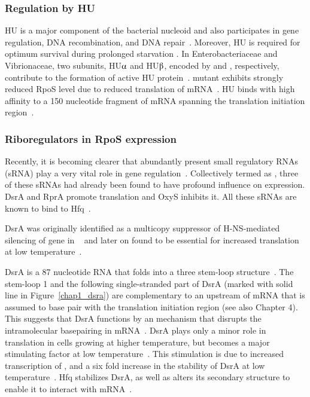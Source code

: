 \subsubsection{Regulation by HU}

HU is a major component of the bacterial nucleoid and also
participates in gene regulation, DNA recombination, and DNA
repair~\citep{Hengge2002}. Moreover, HU is required for optimum
survival during prolonged starvation \citep{Claret1997}. In
Enterobacteriaceae and Vibrionaceae, two subunits, HU$\alphaup$
and HU$\betaup$, encoded by  and , respectively,
contribute to the formation of active HU
protein~\citep{Oberto2001}\@.  mutant exhibits strongly
reduced RpoS level due to reduced translation of 
mRNA~\citep{Balandina2001}. HU binds with high affinity to a 150
nucleotide fragment of  mRNA spanning the translation
initiation region~\citep{Balandina2001}.

\subsubsection{Riboregulators in RpoS expression}
\label{chap1:srna} Recently, it is becoming clearer that
abundantly present small regulatory RNAs (sRNA) play a very vital
role in gene regulation~\citep[reviewed
in][]{Altuvia2000,Wassarman2002,Eddy2001}. Collectively termed as
, three of these sRNAs had already been found to
have profound influence on  expression. DsrA and RprA
promote  translation and OxyS inhibits it. All these sRNAs
are known to bind to Hfq~\citep{Wassarman2002}.

DsrA was originally identified as a multicopy suppressor of
H-NS-mediated silencing of  gene in
~\citep{Sledjeski1995} and later on found to be essential
for increased  translation at low
temperature~\citep{Sledjeski1996}.

DsrA is a 87 nucleotide RNA that folds into a three stem-loop
structure~\citep[][Figure~\ref{chap1_dsra}]{Lease2000,Majdalani1998}.
The stem-loop 1 and the following single-stranded part of DsrA
(marked with solid line in Figure~\ref{chap1_dsra}) are
complementary to an upstream  of 
mRNA that is assumed to base pair with the translation initiation
region (see also Chapter 4). This suggests that DsrA functions by
an  mechanism that disrupts the intramolecular
basepairing  in 
mRNA~\citep{Lease2000,Lease1998,Majdalani1998,Lease2000b}. DsrA
plays only a minor role in  translation in cells growing
at higher temperature, but becomes a major stimulating factor at
low temperature~\citep{Sledjeski1996}. This stimulation is due to
increased transcription of , and a six fold increase in
the stability of DsrA at low temperature~\citep{Repoila2001}. Hfq
stabilizes DsrA, as well as alters its secondary structure to
enable it to interact with  mRNA~\citep{Sledjeski2001}.



